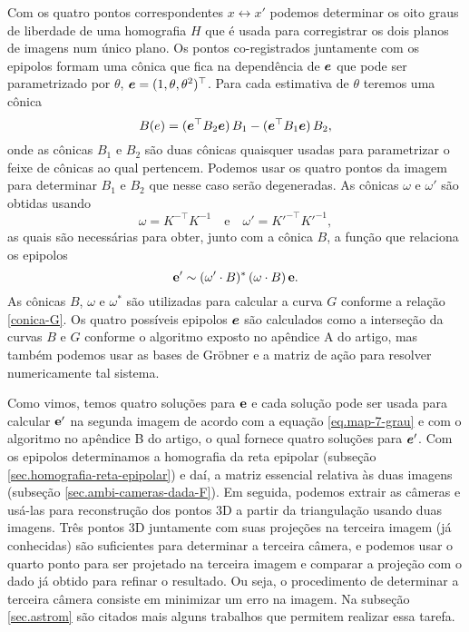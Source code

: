 Com os quatro pontos correspondentes $x\leftrightarrow x'$ podemos determinar os oito graus de liberdade de uma homografia $H$ que é usada para corregistrar os dois planos de imagens num único plano. Os pontos co-registrados juntamente com os epipolos formam uma cônica que fica na dependência de $\boldsymbol{e}$ que pode ser parametrizado por $\theta$, $\boldsymbol{e}=(1,\theta,\theta^2)^\top$. Para cada estimativa de $\theta$ teremos uma cônica 
\begin{equation*}
B(e)=(\boldsymbol{e}^\top B_2\boldsymbol{e})\,B_1-(\boldsymbol{e}^\top B_1\boldsymbol{e})\,B_2,
\end{equation*}
onde as cônicas $B_1$ e $B_2$ são duas cônicas quaisquer usadas para parametrizar o feixe de cônicas ao qual pertencem. Podemos usar os quatro pontos da imagem para determinar $B_1$ e $B_2$ que nesse caso serão degeneradas. As cônicas $\omega$ e $\omega'$ são obtidas usando
\begin{equation*}
\omega=K^{-\top}K^{-1}\quad\text{e}\quad\omega'=K'^{-\top}K'^{-1},
\end{equation*}
as quais são necessárias para obter, junto com a cônica $B$, a função que relaciona os epipolos
\begin{equation*}
{\bf e'} \sim (\omega' \cdot B)^*\,(\omega \cdot B)\,{\bf e}.
\end{equation*}
As cônicas $B$, $\omega$ e $\omega^*$ são utilizadas para calcular a curva $G$ conforme a relação \ref{conica-G}. Os quatro possíveis epipolos $\boldsymbol{e}$ são calculados como a interseção da curvas $B$ e $G$ conforme o algoritmo exposto no apêndice A do artigo, mas também podemos usar as bases de Gr\"obner e a matriz de ação para resolver numericamente tal sistema.

Como vimos, temos quatro soluções para   ${\bf e}$ e cada solução pode ser usada para calcular ${\bf e'}$ na segunda imagem de acordo com a equação \ref{eq.map-7-grau} e com o algoritmo no apêndice B do artigo, o qual fornece quatro soluções para $\boldsymbol{e}'$. Com os epipolos determinamos a homografia da reta epipolar (subseção \ref{sec.homografia-reta-epipolar}) e daí, a matriz essencial relativa às duas imagens (subseção \ref{sec.ambi-cameras-dada-F}). Em seguida, podemos extrair as câmeras e usá-las para reconstrução dos pontos 3D a partir da triangulação usando duas imagens. Três pontos 3D juntamente com suas projeções na terceira imagem (já conhecidas) são suficientes para determinar a terceira câmera, e podemos usar o quarto ponto para ser projetado na terceira imagem e comparar a projeção com o dado já obtido para refinar o resultado. Ou seja, o procedimento de determinar a terceira câmera consiste em minimizar um erro na imagem. Na subseção \ref{sec.astrom} são citados mais alguns trabalhos que permitem realizar essa tarefa.

